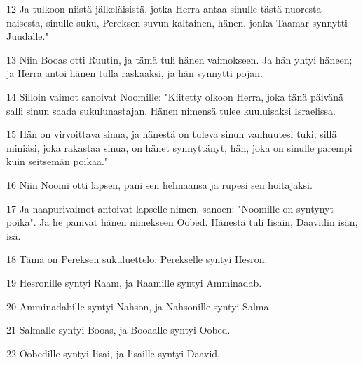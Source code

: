 \par 12 Ja tulkoon niistä jälkeläisistä, jotka Herra antaa sinulle tästä nuoresta naisesta, sinulle suku, Pereksen suvun kaltainen, hänen, jonka Taamar synnytti Juudalle."
\par 13 Niin Booas otti Ruutin, ja tämä tuli hänen vaimokseen. Ja hän yhtyi häneen; ja Herra antoi hänen tulla raskaaksi, ja hän synnytti pojan.
\par 14 Silloin vaimot sanoivat Noomille: "Kiitetty olkoon Herra, joka tänä päivänä salli sinun saada sukulunastajan. Hänen nimensä tulee kuuluisaksi Israelissa.
\par 15 Hän on virvoittava sinua, ja hänestä on tuleva sinun vanhuutesi tuki, sillä miniäsi, joka rakastaa sinua, on hänet synnyttänyt, hän, joka on sinulle parempi kuin seitsemän poikaa."
\par 16 Niin Noomi otti lapsen, pani sen helmaansa ja rupesi sen hoitajaksi.
\par 17 Ja naapurivaimot antoivat lapselle nimen, sanoen: "Noomille on syntynyt poika". Ja he panivat hänen nimekseen Oobed. Hänestä tuli Iisain, Daavidin isän, isä.
\par 18 Tämä on Pereksen sukuluettelo: Perekselle syntyi Hesron.
\par 19 Hesronille syntyi Raam, ja Raamille syntyi Amminadab.
\par 20 Amminadabille syntyi Nahson, ja Nahsonille syntyi Salma.
\par 21 Salmalle syntyi Booas, ja Booaalle syntyi Oobed.
\par 22 Oobedille syntyi Iisai, ja Iisaille syntyi Daavid.


